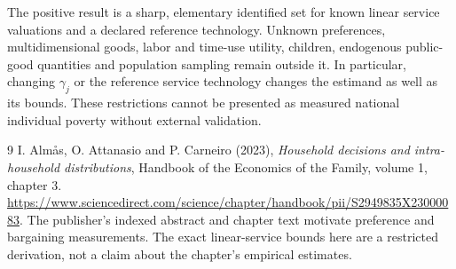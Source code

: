 \documentclass[11pt,a4paper]{article}
\begin{document}
The positive result is a sharp, elementary identified set for known linear service valuations and a declared reference technology. Unknown preferences, multidimensional goods, labor and time-use utility, children, endogenous public-good quantities and population sampling remain outside it. In particular, changing $\gamma_j$ or the reference service technology changes the estimand as well as its bounds. These restrictions cannot be presented as measured national individual poverty without external validation.

\begin{thebibliography}{9}
 I. Alm\aa s, O. Attanasio and P. Carneiro (2023), \emph{Household decisions and intra-household distributions}, Handbook of the Economics of the Family, volume 1, chapter 3. \url{https://www.sciencedirect.com/science/chapter/handbook/pii/S2949835X23000083}. The publisher's indexed abstract and chapter text motivate preference and bargaining measurements. The exact linear-service bounds here are a restricted derivation, not a claim about the chapter's empirical estimates.
\end{thebibliography}
\end{document}

